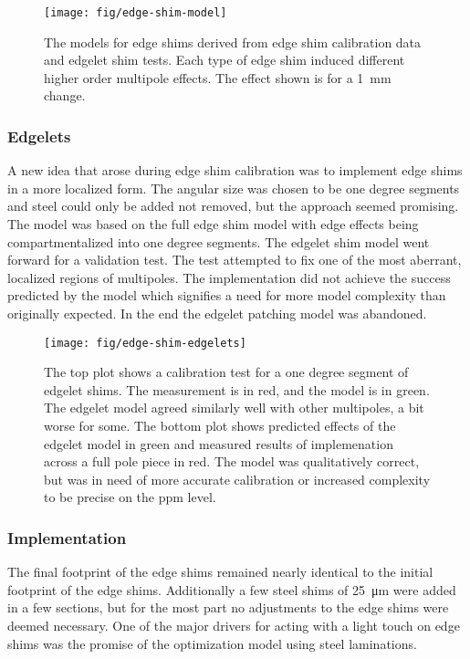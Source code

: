\begin{figure}
\centering
\texttt{[image: fig/edge-shim-model]}
\caption{
    The models for edge shims derived from edge shim calibration data and edgelet shim tests.  Each type of edge shim induced different higher order multipole effects.  The effect shown is for a \SI{1}{\milli\meter} change. 
    \label{fig:edge-shim-model}
}
\end{figure}

\subsubsection{Edgelets}

A new idea that arose during edge shim calibration was to implement edge shims in a more localized form.  The angular size was chosen to be one degree segments and steel could only be added not removed, but the approach seemed promising.  The model was based on the full edge shim model with edge effects being compartmentalized into one degree segments.  The edgelet shim model went forward for a validation test.  The test attempted to fix one of the most aberrant, localized regions of multipoles.  The implementation did not achieve the success predicted by the model which signifies a need for more model complexity than originally expected. In the end the edgelet patching model was abandoned.

\begin{figure}
\centering
\texttt{[image: fig/edge-shim-edgelets]}
\caption{
    The top plot shows a calibration test for a one degree segment of edgelet shims.  The measurement is in red, and the model is in green. The edgelet model agreed similarly well with other multipoles, a bit worse for some.  The bottom plot shows predicted effects of the edgelet model in green and measured results of  implemenation across a full pole piece in red.  The model was qualitatively correct, but was in need of more accurate calibration or increased complexity to be precise on the ppm level. 
    \label{fig:edge-shim-edgelets}
}
\end{figure}

\subsubsection{Implementation}

The final footprint of the edge shims remained nearly identical to the initial footprint of the edge shims.  Additionally a few steel shims of \SI{25}{\micro \meter} were added in a few sections, but for the most part no adjustments to the edge shims were deemed necessary.  One of the major drivers for acting with a light touch on edge shims was the promise of the optimization model using steel laminations.

